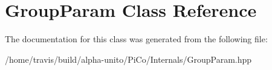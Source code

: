 \hypertarget{class_group_param}{\section{\-Group\-Param \-Class \-Reference}
\label{class_group_param}
}


\-The documentation for this class was generated from the following file\-:\begin{DoxyCompactItemize}
\item 
/home/travis/build/alpha-\/unito/\-Pi\-Co/\-Internals/\-Group\-Param.\-hpp\end{DoxyCompactItemize}
